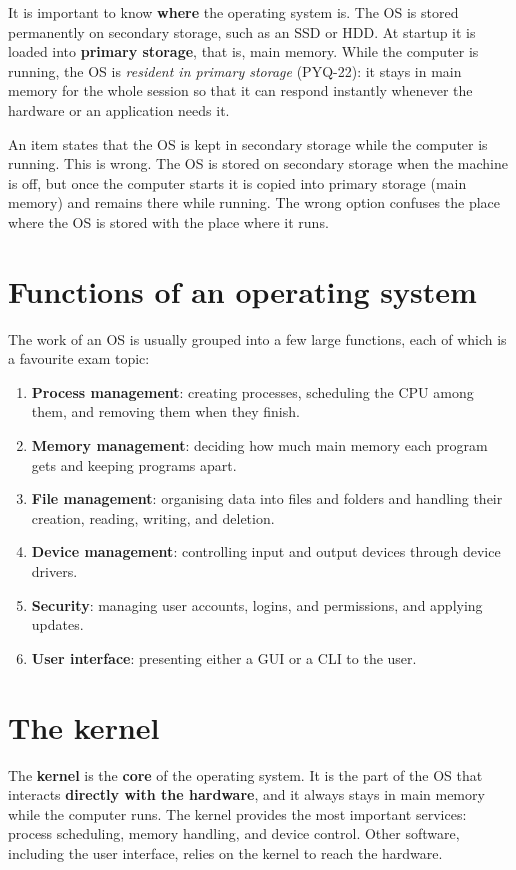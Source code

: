 It is important to know \textbf{where} the operating system is. The OS is
stored permanently on secondary storage, such as an SSD or HDD. At startup it
is loaded into \textbf{primary storage}, that is, main memory. While the
computer is running, the OS is \emph{resident in primary storage} (PYQ-22): it
stays in main memory for the whole session so that it can respond instantly
whenever the hardware or an application needs it.

\begin{example}
An item states that the OS is kept in secondary storage while the computer is
running. This is wrong. The OS is stored on secondary storage when the machine
is off, but once the computer starts it is copied into primary storage (main
memory) and remains there while running. The wrong option confuses the place
where the OS is stored with the place where it runs.
\end{example}

\section{Functions of an operating system}
The work of an OS is usually grouped into a few large functions, each of which
is a favourite exam topic:

\begin{enumerate}
  \item \textbf{Process management}: creating processes, scheduling the CPU
    among them, and removing them when they finish.
  \item \textbf{Memory management}: deciding how much main memory each
    program gets and keeping programs apart.
  \item \textbf{File management}: organising data into files and folders and
    handling their creation, reading, writing, and deletion.
  \item \textbf{Device management}: controlling input and output devices
    through device drivers.
  \item \textbf{Security}: managing user accounts, logins, and permissions, and
    applying updates.
  \item \textbf{User interface}: presenting either a GUI or a CLI to the user.
\end{enumerate}

\section{The kernel}
The \textbf{kernel} is the \textbf{core} of the operating system. It is the
part of the OS that interacts \textbf{directly with the hardware}, and it
always stays in main memory while the computer runs. The kernel provides the
most important services: process scheduling, memory handling, and device
control. Other software, including the user interface, relies on the kernel to
reach the hardware.


